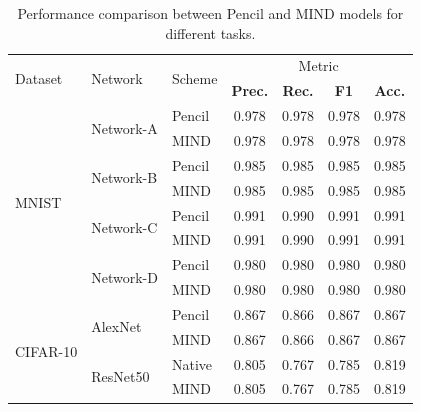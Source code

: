 \documentclass[conference]{IEEEtran}
\begin{document}
\begin{table}[ht]
\centering
\caption{Performance comparison between Pencil and MIND models for different tasks.}
\begin{tabular}{ l|l|l | c c c c } 
\hline
\multirow{2}{*}{Dataset} & \multirow{2}{*}{Network} & \multirow{2}{*}{Scheme} & \multicolumn{4}{c}{Metric} \\ 
\cline{4-7}
                      &                        &                        & \textbf{Prec.} & \textbf{Rec.} & \textbf{F1} & \textbf{Acc.} \\ 
\hline
\multirow{8}{*}{MNIST}   & \multirow{2}{*}{Network-A}      & Pencil & 0.978 & 0.978 & 0.978 & 0.978 \\ 
                      &            & MIND    & 0.978 & 0.978 & 0.978 & 0.978 \\ 
\cline{2-7}
                      & \multirow{2}{*}{Network-B}   & Pencil & 0.985 & 0.985 & 0.985 & 0.985 \\ 
                      &            & MIND    & 0.985 & 0.985 & 0.985 & 0.985 \\ 
\cline{2-7}
                      & \multirow{2}{*}{Network-C}      & Pencil & 0.991 & 0.990 & 0.991 & 0.991 \\ 
                      &            & MIND    & 0.991 & 0.990 & 0.991 & 0.991 \\ 
\cline{2-7}
                      & \multirow{2}{*}{Network-D}   & Pencil & 0.980 & 0.980 & 0.980 & 0.980 \\ 
                      &            & MIND    & 0.980 & 0.980 & 0.980 & 0.980 \\ 
\hline
\multirow{4}{*}{CIFAR-10} & \multirow{2}{*}{AlexNet}    & Pencil  &  0.867  & 0.866  & 0.867 & 0.867  \\ 
                      &            & MIND    &  0.867  & 0.866  & 0.867 & 0.867  \\ 
\cline{2-7}
                      & \multirow{2}{*}{ResNet50}    & Native  & 0.805 & 0.767 & 0.785 & 0.819 \\ 
                      &            & MIND    & 0.805 & 0.767 & 0.785 & 0.819\\ 
\cline{2-7}
                    

\end{tabular}
\end{table}
\end{document}

